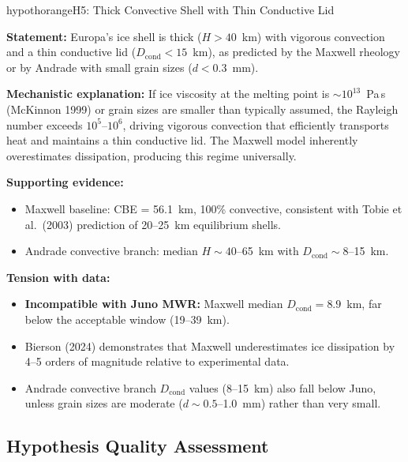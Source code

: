 \documentclass[11pt,letterpaper]{article}
\begin{document}
\newpage
\begin{hypothesisbox}{hypothorange}{H5: Thick Convective Shell with Thin Conductive Lid}

\textbf{Statement:} Europa's ice shell is thick ($H > 40$~km) with vigorous convection and a thin conductive lid ($D_\mathrm{cond} < 15$~km), as predicted by the Maxwell rheology or by Andrade with small grain sizes ($d < 0.3$~mm).

\textbf{Mechanistic explanation:} If ice viscosity at the melting point is $\sim 10^{13}$~Pa\,s (McKinnon 1999) or grain sizes are smaller than typically assumed, the Rayleigh number exceeds $10^5$--$10^6$, driving vigorous convection that efficiently transports heat and maintains a thin conductive lid. The Maxwell model inherently overestimates dissipation, producing this regime universally.

\textbf{Supporting evidence:}
\begin{itemize}[nosep]
  \item Maxwell baseline: CBE = 56.1~km, 100\% convective, consistent with Tobie et al.\ (2003) prediction of 20--25~km equilibrium shells.
  \item Andrade convective branch: median $H \sim 40$--65~km with $D_\mathrm{cond} \sim 8$--15~km.
\end{itemize}

\textbf{Tension with data:}
\begin{itemize}[nosep]
  \item \textbf{Incompatible with Juno MWR:} Maxwell median $D_\mathrm{cond} = 8.9$~km, far below the acceptable window (19--39~km).
  \item Bierson (2024) demonstrates that Maxwell underestimates ice dissipation by 4--5 orders of magnitude relative to experimental data.
  \item Andrade convective branch $D_\mathrm{cond}$ values (8--15~km) also fall below Juno, unless grain sizes are moderate ($d \sim 0.5$--1.0~mm) rather than very small.
\end{itemize}
\end{hypothesisbox}

\subsection{Hypothesis Quality Assessment}
\end{document}
